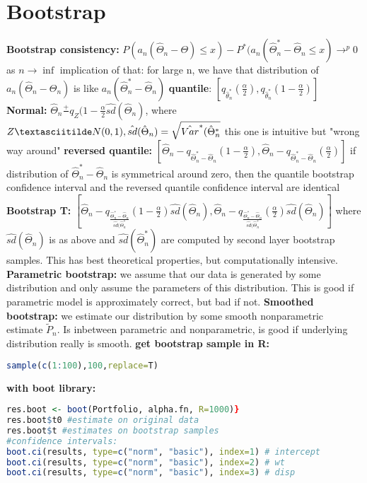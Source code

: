 \section{Bootstrap}
\textbf{Bootstrap consistency: }$P(a_n(\hat\Theta_n-\Theta) \leq x)-P^*(a_n(\hat\Theta_n^*-\hat\Theta_n \leq x) \rightarrow^p 0$ as $n \rightarrow \inf$ implication of that: for large n, we have that distribution of $a_n(\hat\Theta_n - \Theta_n)$ is like $a_n(\hat\Theta^*_n- \hat\Theta_n)$
\textbf{quantile}: $[q_{\hat\theta_n^*}(\frac{\alpha}{2}),q_{\hat\theta_n^*}(1-\frac{\alpha}{2})]$
\textbf{Normal: }$\hat\Theta_n \frac{+}{} q_Z(1-\frac{\alpha}{2}\hat{sd}(\hat\Theta_n)$, where $Z \textasciitilde N(0,1), \hat{sd}(\hat \Theta_n) = \sqrt{\hat{Var}^*(\hat{\Theta}_n^*}$ this one is intuitive but "wrong way around"
\textbf{reversed quantile: } $[\hat\Theta_n - q_{\hat\Theta_n^*-\hat\Theta_n}(1-\frac{\alpha}{2}), \hat\Theta_n - q_{\hat\Theta_n^*-\hat\Theta_n}(\frac{\alpha}{2})]$  if distribution of $\hat \Theta_n^*- \hat \Theta_n$ is symmetrical around zero, then the quantile bootstrap confidence interval and the reversed quantile confidence interval are identical 
\textbf{Bootstrap T: }$[\hat\Theta_n - q_{\frac{\hat\Theta_n^*-\hat\Theta_n}{\hat{sd}(\hat\Theta_n^*}}(1-\frac{\alpha}{2})\hat{sd}(\hat\Theta_n), \hat\Theta_n - q_{\frac{\hat\Theta_n^*-\hat\Theta_n}{\hat{sd}(\hat\Theta_n^*}}(\frac{\alpha}{2})\hat{sd}(\hat\Theta_n)]$ where $\hat{sd}(\hat\Theta_n)$ is as above and $\hat{sd}(\hat\Theta_n^*)$ are computed by second layer bootstrap samples. This has best theoretical properties, but computationally intensive. 
\textbf{Parametric bootstrap: } we assume that our data is generated by some distribution and only assume the parameters of this distribution. This is good if parametric model is approximately correct, but bad if not. 
\textbf{Smoothed bootstrap: } we estimate our distribution by some smooth nonparametric estimate $\tilde P_n$. Is inbetween parametric and nonparametric, is good if underlying distribution really is smooth. 
\textbf{get bootstrap sample in R: }
\begin{lstlisting}[language=R]
sample(c(1:100),100,replace=T)
\end{lstlisting} 
\textbf{with boot library: } \begin{lstlisting}[language=R]
res.boot <- boot(Portfolio, alpha.fn, R=1000)}
res.boot$t0 #estimate on original data
res.boot$t #estimates on bootstrap samples
#confidence intervals: 
boot.ci(results, type=c("norm", "basic"), index=1) # intercept 
boot.ci(results, type=c("norm", "basic"), index=2) # wt 
boot.ci(results, type=c("norm", "basic"), index=3) # disp
\end{lstlisting}